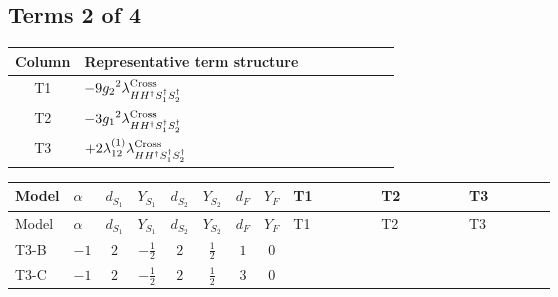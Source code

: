\documentclass[8pt]{article}
\begin{document}
\begin{landscape}
\subsection*{Terms 2 of 4}
\begin{center}
\begin{tabular}{@{}c >{\raggedright\arraybackslash}p{0.82\linewidth}@{}}
\toprule
Column & Representative term structure \\
\midrule
T1 & \(\displaystyle -9 {g_2}^2 {\lambda_{H H^\dagger S_1^\dagger S_2^\dagger}^{\rm Cross}}\) \\
\midrule
T2 & \(\displaystyle -3 {g_1}^2 {\lambda_{H H^\dagger S_1^\dagger S_2^\dagger}^{\rm Cross}}\) \\
\midrule
T3 & \(\displaystyle +2 {\lambda_{12}^{(1)}} {\lambda_{H H^\dagger S_1^\dagger S_2^\dagger}^{\rm Cross}}\) \\
\midrule
\bottomrule
\end{tabular}
\end{center}
\smallskip
\tiny
\begin{longtable}{@{}llcccccc >{\raggedright\arraybackslash}p{0.21\linewidth} >{\raggedright\arraybackslash}p{0.21\linewidth} >{\raggedright\arraybackslash}p{0.21\linewidth}@{}}
\toprule
Model & $\alpha$ & $d_{S_1}$ & $Y_{S_1}$ & $d_{S_2}$ & $Y_{S_2}$ & $d_F$ & $Y_F$ & T1 & T2 & T3 \\
\midrule
\endfirsthead
\toprule
Model & $\alpha$ & $d_{S_1}$ & $Y_{S_1}$ & $d_{S_2}$ & $Y_{S_2}$ & $d_F$ & $Y_F$ & T1 & T2 & T3 \\
\midrule
\endhead
T3-B & $-1$ & $2$ & $-\frac{1}{2}$ & $2$ & $\frac{1}{2}$ & $1$ & $0$ & \scriptsize\adjustbox{max width=\linewidth}{$\begin{gathered} -9 {g_2}^2 {\lambda_{H H^\dagger S_1^\dagger S_2^\dagger}^{\rm Cross}}\end{gathered}$} & \scriptsize\adjustbox{max width=\linewidth}{$\begin{gathered} -3 {g_1}^2 {\lambda_{H H^\dagger S_1^\dagger S_2^\dagger}^{\rm Cross}}\end{gathered}$} & \scriptsize\adjustbox{max width=\linewidth}{$\begin{gathered} +2 {\lambda_{12}^{(1)}} {\lambda_{H H^\dagger S_1^\dagger S_2^\dagger}^{\rm Cross}}\end{gathered}$} \\
\midrule
T3-C & $-1$ & $2$ & $-\frac{1}{2}$ & $2$ & $\frac{1}{2}$ & $3$ & $0$ & \scriptsize\adjustbox{max width=\linewidth}{$\begin{gathered} -9 {g_2}^2 {\lambda_{H H^\dagger S_1^\dagger S_2^\dagger}^{\rm Cross}}\end{gathered}$} & \scriptsize\adjustbox{max width=\linewidth}{$\begin{gathered} -3 {g_1}^2 {\lambda_{H H^\dagger S_1^\dagger S_2^\dagger}^{\rm Cross}}\end{gathered}$} & \scriptsize\adjustbox{max width=\linewidth}{$\begin{gathered} +2 {\lambda_{12}^{(1)}} {\lambda_{H H^\dagger S_1^\dagger S_2^\dagger}^{\rm Cross}}\end{gathered}$} \\

\end{longtable}
\end{landscape}
\end{document}
